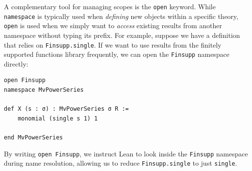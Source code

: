 A complementary tool for managing scopes is the \lstinline|open| keyword.
While \lstinline|namespace| is typically used when \textit{defining} new
objects within a specific theory, \lstinline|open| is used when we simply
want to \textit{access} existing results from another namespace without
typing its prefix. For example, suppose we have a definition that relies on
\lstinline|Finsupp.single|. If we want to use results from the
finitely supported functions library frequently, we can open the
\lstinline|Finsupp| namespace directly:

\begin{lstlisting}[language=Lean]
open Finsupp
namespace MvPowerSeries

def X (s : σ) : MvPowerSeries σ R :=
    monomial (single s 1) 1

end MvPowerSeries
\end{lstlisting}

By writing \lstinline|open Finsupp|, we instruct Lean to look inside the \lstinline|Finsupp| namespace during name resolution, allowing us to reduce \lstinline|Finsupp.single| to just \lstinline|single|.






